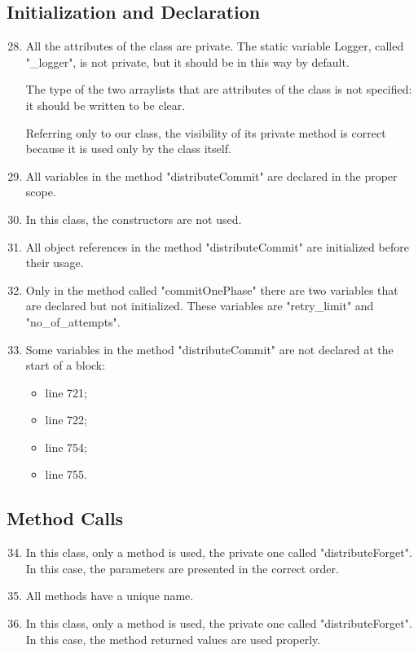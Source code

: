 \subsection{Initialization and Declaration}
\begin{enumerate}
	\setcounter{enumi}{27}
	\item All the attributes of the class are private. The static variable Logger, called "\_logger", is not private, but it should be in this way by default. 
	
    The type of the two arraylists that are attributes of the class is not specified: it should be written to be clear.
    
    Referring only to our class, the visibility of its private method is correct because it is used only by the class itself. 

	\item All variables in the method "distributeCommit" are declared in the proper scope.
	\item In this class, the constructors are not used.
	\item All object references in the method "distributeCommit" are initialized before their usage.
	\item Only in the method called "commitOnePhase" there are two variables that are declared but not initialized. These variables are "retry\_limit" and "no\_of\_attempts".
	\item Some variables in the method "distributeCommit" are not declared at the start of a block:
	\begin{itemize}
		\item line 721;
		\item line 722;
		\item line 754;
		\item line 755.
	\end{itemize}
\end{enumerate}
\subsection{Method Calls}
\begin{enumerate}
	\setcounter{enumi}{33}
	\item In this class, only a method is used, the private one called "distributeForget". In this case, the parameters are presented in the correct order.
	\item All methods have a unique name.
	\item In this class, only a method is used, the private one called "distributeForget". In this case, the method returned values are used properly.
\end{enumerate}
